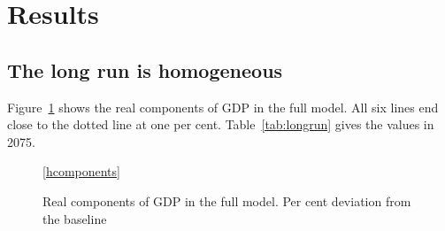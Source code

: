 \documentclass[11pt,a4paper]{article}
\newcommand{\components}[1]{%
  \addplot[one, domain=2026:2075, samples=2] {1};
  \addplot[black, line width=1.4pt] table[x=year, y=gdp#1]{\hmacro};
  \addplot[fcblue, line width=1.0pt] table[x=year, y=con#1]{\hmacro};
  \addplot[fcorange, line width=1.0pt] table[x=year, y=inv#1]{\hmacro};
  \addplot[fcgreen, line width=1.0pt] table[x=year, y=gov#1]{\hmacro};
  \addplot[fcpurple, line width=1.0pt] table[x=year, y=exp#1]{\hmacro};
  \addplot[fcred, line width=1.0pt, densely dashed] table[x=year, y=imp#1]{\hmacro};
}
\newcommand{\componentlegend}{%
  \legend{GDP, Private consumption, Investment, Government consumption, Exports, Imports}
}
\begin{document}
\section{Results}

\subsection{The long run is homogeneous}

Figure~\ref{fig:components} shows the real components of GDP in the full model. All six lines end close to the dotted line at one per cent.
Table~\ref{tab:longrun} gives the values in 2075.

\begin{figure}[H]
\centering
{}

\ref{hcomponents}
\caption{Real components of GDP in the full model. Per cent deviation from the baseline}
\label{fig:components}
\end{figure}
\end{document}
